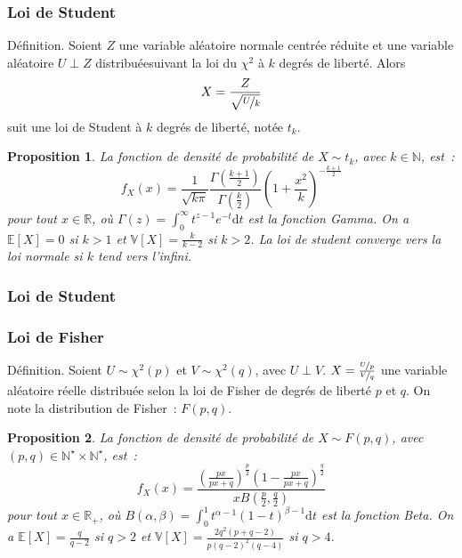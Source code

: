 \documentclass[10pt]{beamer}
\theoremstyle{plain}
\newenvironment{defn}[1]
{\bgroup \small\begin{block}{Définition. #1}}
  {\end{block}\egroup}
\newtheorem{prop}{Proposition}
\begin{document}
\begin{frame}
  \frametitle{Loi de Student}

  \begin{defn}{}
    Soient $Z$ une variable aléatoire normale centrée réduite et une variable aléatoire $U\perp Z$ distribuéesuivant la loi du $\chi^2$ à $k$ degrés de liberté. Alors
    \[
      X = \frac{Z}{\sqrt{\nicefrac{U}{k}}}
    \]
    suit une loi de Student à $k$ degrés de liberté, notée $t_k$.
  \end{defn}

  \bigskip

  \begin{prop}\label{prop:student}
    La fonction de densité de probabilité de $X\sim t_k$,
    avec $k\in\mathbb N$, est~:
    \[
      f_X(x) =
      \frac{1}{\sqrt{k\pi}}\frac{\Gamma(\frac{k+1}{2})}{\Gamma(\frac{k}{2})}\left(1+\frac{x^2}{k}\right)^{-\frac{k+1}{2}}
    \]
    pour tout $x\in\mathbb R$, où $\Gamma(z) = \int_0^{\infty}t^{z-1}e^{-t}\mathrm dt$ est la
    fonction Gamma. On a $\mathbb E\left[ X \right]=0$ si $k>1$ et $\mathbb V\left[ X \right] = \frac{k}{k-2}$ si $k>2$. La loi de student converge vers la loi normale si $k$ tend vers l'infini.
  \end{prop}

\end{frame}


\begin{frame}
  \frametitle{Loi de Student}

  \bigskip

  \begin{center}
    
  \end{center}


\end{frame}



\begin{frame}
  \frametitle{Loi de Fisher}

  \begin{defn}{}
    Soient $U\sim\chi^2(p)$ et $V\sim\chi^2(q)$, avec  $U\perp V$. $X = \frac{\nicefrac{U}{p}}{\nicefrac{V}{q}}$ une variable aléatoire réelle distribuée selon la loi de Fisher de degrés de liberté $p$ et $q$. On note la distribution de Fisher~: $F(p,q)$.
  \end{defn}

  \bigskip

  \begin{prop}\label{prop:fisher}
    La fonction de densité de probabilité de $X\sim F(p,q)$,
    avec $(p,q)\in\mathbb N^{\star}\times \mathbb N^{\star}$, est~:
    \[
      f_X(x) = \frac{\left( \frac{px}{px+q} \right)^{\frac{p}{2}}\left( 1-\frac{px}{px+q} \right)^{\frac{q}{2}}}{x B\left(\frac{p}{2},\frac{q}{2}\right)}
    \]
    pour tout $x\in\mathbb R_+$, où $B(\alpha,\beta) = \int_0^1t^{\alpha-1}(1-t)^{\beta-1}\mathrm dt$ est la
    fonction Beta. On a $\mathbb E\left[ X \right]=\frac{q}{q-2}$ si $q>2$ et $\mathbb V\left[ X \right] = \frac{2q^2\left( p+q-2 \right)}{p\left( q-2 \right)^2\left( q-4 \right)}$ si $q>4$.
  \end{prop}

\end{frame}
\end{document}
